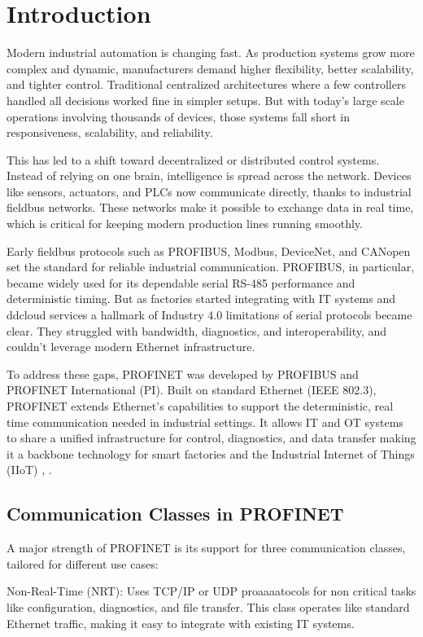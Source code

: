 \documentclass[conference]{IEEEtran}
\begin{document}
\section{Introduction}
Modern industrial automation is changing fast. As production systems grow more complex and dynamic, manufacturers demand higher flexibility, better scalability, and tighter control. Traditional centralized architectures where a few controllers handled all decisions worked fine in simpler setups. But with today’s large scale operations involving thousands of devices, those systems fall short in responsiveness, scalability, and reliability.

This has led to a shift toward decentralized or distributed control systems. Instead of relying on one brain, intelligence is spread across the network. Devices like sensors, actuators, and PLCs now communicate directly, thanks to industrial fieldbus networks. These networks make it possible to exchange data in real time, which is critical for keeping modern production lines running smoothly.

Early fieldbus protocols such as PROFIBUS, Modbus, DeviceNet, and CANopen set the standard for reliable industrial communication. PROFIBUS, in particular, became widely used for its dependable serial RS-485 performance and deterministic timing. But as factories started integrating with IT systems and ddcloud services a hallmark of Industry 4.0 limitations of serial protocols became clear. They struggled with bandwidth, diagnostics, and interoperability, and couldn’t leverage modern Ethernet infrastructure.

To address these gaps, PROFINET was developed by PROFIBUS and PROFINET International (PI). Built on standard Ethernet (IEEE 802.3), PROFINET extends Ethernet’s capabilities to support the deterministic, real time communication needed in industrial settings. It allows IT and OT systems to share a unified infrastructure for control, diagnostics, and data transfer making it a backbone technology for smart factories and the Industrial Internet of Things (IIoT) \cite{galloway2012industrial}, \cite{neumann2007communication}.

\subsection{Communication Classes in PROFINET} 
A major strength of PROFINET is its support for three communication classes, tailored for different use cases:

Non-Real-Time (NRT): Uses TCP/IP or UDP proaaaatocols for non critical tasks like configuration, diagnostics, and file transfer. This class operates like standard Ethernet traffic, making it easy to integrate with existing IT systems.
\end{document}
